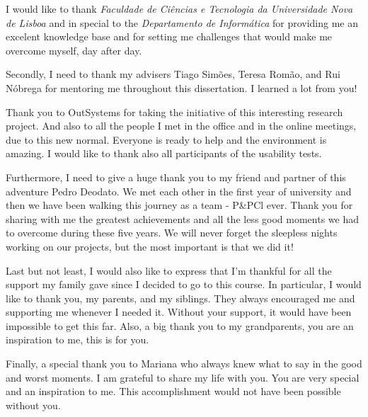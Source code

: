 \acknowledgements

I would like to thank \textit{Faculdade de Ciências e Tecnologia da Universidade Nova de Lisboa} and in special to the \textit{Departamento de Informática} for providing me an excelent knowledge base and for setting me challenges that would make me overcome myself, day after day.

Secondly, I need to thank my advisers Tiago Simões, Teresa Romão, and Rui Nóbrega for mentoring me throughout this dissertation. I learned a lot from you!  

Thank you to OutSystems for taking the initiative of this interesting research project. And also to all the people I met in the office and in the online meetings, due to this new normal. Everyone is ready to help and the environment is amazing. I would like to thank also all participants of the usability tests.

Furthermore, I need to give a huge thank you to my friend and partner of this adventure Pedro Deodato. We met each other in the first year of university and then we have been walking this journey as a team - P\&PCl ever. Thank you for sharing with me the greatest achievements and all the less good moments we had to overcome during these five years. We will never forget the sleepless nights working on our projects, but the most important is that we did it!

Last but not least, I would also like to express that I'm thankful for all the support my family gave since I decided to go to this course. In particular, I would like to thank you, my parents, and my siblings. They always encouraged me and supporting me whenever I needed it. Without your support, it would have been impossible to get this far. Also, a big thank you to my grandparents, you are an inspiration to me, this is for you. 


Finally, a special thank you to Mariana who always knew what to say in the good and worst moments. I am grateful to share my life with you. You are very special and an inspiration to me. This accomplishment would not have been possible without you.

